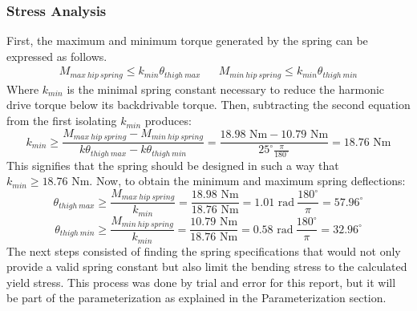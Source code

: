 \subsubsection{Stress Analysis}
First, the maximum and minimum torque generated by the spring can be expressed as follows.
\begin{align}
    M_{max\ hip\ spring} \leq k_{min}\theta_{thigh\ max} && M_{min\ hip\ spring} \leq k_{min}\theta_{thigh\ min}
\end{align}
Where $k_{min}$ is the minimal spring constant necessary to reduce the harmonic drive torque below its backdrivable torque. Then, subtracting the second equation from the first isolating $k_{min}$ produces:
\begin{equation}
    k_{min} \geq  \frac{M_{max\ hip\ spring} - M_{min\ hip\ spring}}{k\theta_{thigh\ max} - k\theta_{thigh\ min}} = \frac{18.98\text{ Nm} - 10.79\text{ Nm}}{25^{\circ}\frac{\pi}{180^{\circ}}} = 18.76\text{ Nm}
\end{equation}
This signifies that the spring should be designed in such a way that $k_{min} \geq 18.76\text{ Nm}$. Now, to obtain the minimum and maximum spring deflections:
\begin{equation}
    \theta_{thigh\ max} \geq \frac{M_{max\ hip\ spring}}{k_{min}} = \frac{18.98\text{ Nm}}{18.76\text{ Nm}} = 1.01\text{ rad}\ \frac{180^{\circ}}{\pi} = 57.96^{\circ}
\end{equation}
\begin{equation}
    \theta_{thigh\ min} \geq \frac{M_{min\ hip\ spring}}{k_{min}} = \frac{10.79\text{ Nm}}{18.76\text{ Nm}} = 0.58\text{ rad}\ \frac{180^{\circ}}{\pi} = 32.96^{\circ}
\end{equation}
The next steps consisted of finding the spring specifications that would not only provide a valid spring constant but also limit the bending stress to the calculated yield stress. This process was done by trial and error for this report, but it will be part of the parameterization as explained in the Parameterization section.

